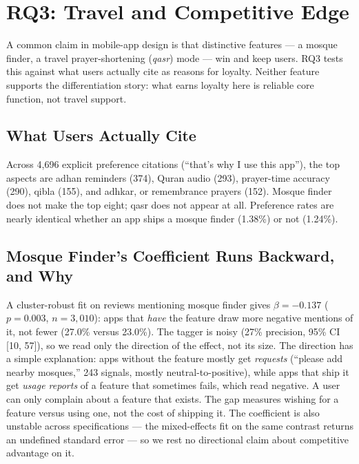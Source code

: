 
\section{RQ3: Travel and Competitive Edge}
\label{sec:rq3}

A common claim in mobile-app design is that distinctive features --- a mosque
finder, a travel prayer-shortening (\emph{qasr}) mode --- win and keep users.
RQ3 tests this against what users actually cite as reasons for loyalty.
Neither feature supports the differentiation story: what earns loyalty here is
reliable core function, not travel support.

\subsection{What Users Actually Cite}

Across 4,696 explicit preference citations (``that's why I use this app''),
the top aspects are adhan reminders (374), Quran audio (293), prayer-time
accuracy (290), qibla (155), and adhkar, or remembrance prayers (152). Mosque finder does not make the
top eight; qasr does not appear at all. Preference rates are nearly identical
whether an app ships a mosque finder (1.38\%) or not (1.24\%).

\subsection{Mosque Finder's Coefficient Runs Backward, and Why}

A cluster-robust fit on reviews mentioning mosque finder gives
\(\beta=-0.137\) (\(p=0.003\), \(n=3{,}010\)): apps that \emph{have} the
feature draw more negative mentions of it, not fewer (27.0\% versus 23.0\%).
The tagger is noisy (27\% precision, 95\% CI [10, 57]), so we read only the
direction of the effect, not its size. The direction has a simple explanation:
apps without the feature mostly get \emph{requests} (``please add nearby
mosques,'' 243 signals, mostly neutral-to-positive), while apps that ship it
get \emph{usage reports} of a feature that sometimes fails, which read
negative. A user can only complain about a feature that exists. The gap
measures wishing for a feature versus using one, not the cost of shipping it.
The coefficient is also unstable across specifications --- the mixed-effects
fit on the same contrast returns an undefined standard error --- so we rest no
directional claim about competitive advantage on it.

